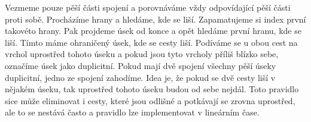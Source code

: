 Vezmeme pouze pěší části spojení a porovnáváme vždy
odpovídající pěší části proti sobě. Procházíme hrany a hledáme, kde se liší.
Zapamatujeme si index první takovéto hrany. Pak projdeme úsek od konce a opět
hledáme první hranu, kde se liší. Tímto máme ohraničený úsek, kde se cesty liší.
Podíváme se u obou cest na vrchol uprostřed tohoto úseku a pokud jsou tyto
vrcholy příliš blízko sebe, označíme úsek jako duplicitní. Pokud mají dvě
spojení všechny pěší úseky duplicitní, jedno ze spojení zahodíme. Idea je, že
pokud se dvě cesty liší v nějakém úseku, tak uprostřed tohoto úseku budou od
sebe nejdál. Toto pravidlo sice může eliminovat i cesty, které jsou odlišné a
potkávají se zrovna uprostřed, ale to se nestává často a pravidlo lze
implementovat v lineárním čase.
